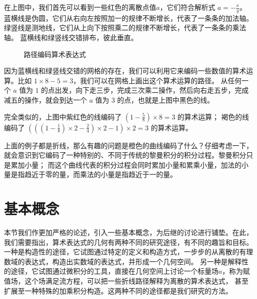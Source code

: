 \documentclass[a4paper,12pt]{book}
\numberwithin{problem}{section}
\numberwithin{definition}{section}
\numberwithin{lemma}{section}
\numberwithin{proposition}{section}
\numberwithin{theorem}{section}
\numberwithin{grammar}{section}
\numberwithin{program}{section}
\numberwithin{convention}{section}
\numberwithin{corollary}{section}
\begin{document}
在上图中，我们首先可以看到一些红色的离散点值$a$，它们符合解析式 $a = -\frac{x}{y}$。
蓝横线是伪圆，它们从右向左按照加一的规律不断增长，代表了一条条的加法轴。绿竖线是测地线，它们从上向下按照乘二的规律不断增长，代表了一条条的乘法轴。
蓝横线和绿竖线交错排布，彼此垂直。

\begin{figure}[ht]\centering
{}
\caption{路径编码算术表达式}\label{fig:encoding}
\end{figure}

因为蓝横线和绿竖线交错的网格的存在，我们可以利用它来编码一些数值的算术运算。比如 $1 \times 8 - 5 = 3$，我们可以在网格上画出这个算术运算的路径。
从任何一个 $a$ 值为 $1$ 的点出发，向下走三步，完成三次乘二操作，然后向右走五步，完成减五的操作，就会到达一个 $a$ 值为 $3$ 的点，也就是上图中黑色的线。

完全类似的，上图中紫红色的线编码了 $(1 - \frac{5}{8}) \times 8 = 3$ 的算术运算；
褐色的线编码了 $(((1 - \frac{1}{8}) \times 2 - \frac{2}{4}) \times 2 - 1) \times 2 = 3$ 的算术运算。

上面的例子都是折线，那么有趣的问题是橙色的曲线编码了什么？仔细考虑一下，就会意识到它编码了一种特别的、不同于传统的黎曼积分的积分过程。黎曼积分只是累加小量；
而这个曲线代表的积分过程会同时累加小量和累乘小量，加法的小量是指趋近于零的量，而乘法的小量是指趋近于一的量。

\newpage

\chapter{基本概念}

本节我们作更加严格的论述，引入一些基本概念，为后继的讨论进行铺垫。在此，我们需要指出，算术表达式的几何有两种不同的研究途径，有不同的趣旨和目标。
一种是构造性的途径，它试图通过特定的定义和构造方式，一步步的从离散的有理数域的表达式，构造出实数域的表达式，并形成一个几何空间。
另一种是解释性的途径，它试图通过微积分的工具，直接在几何空间上讨论一个标量场$a$，称为赋值场，这个场满足流方程，可以把一些折线路径解释为离散的算术表达式，
甚至扩展至一种特殊的加乘积分构造。这两种不同的途径都是我们研究的方法。
\end{document}
